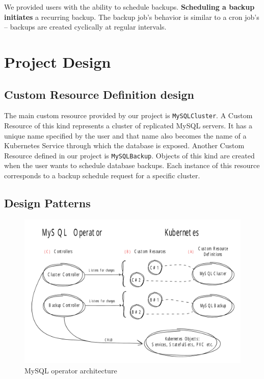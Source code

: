 We provided users with the ability to schedule backups. \textbf{Scheduling a backup initiates} a
recurring backup. The backup job’s behavior is similar to a cron job’s -- backups are created
cyclically at regular intervals.

\section{Project Design}

\subsection{Custom Resource Definition design}
The main custom resource provided by our project is \texttt{MySQLCluster}. A Custom Resource of this kind
represents a cluster of replicated MySQL servers. It has a unique name specified by the user and
that name also becomes the name of a Kubernetes Service through which the database is exposed.
Another Custom Resource defined in our project is \texttt{MySQLBackup}. Objects of this kind are created when
the user wants to schedule database backups. Each instance of this resource corresponds to a backup
schedule request for a specific cluster.

\subsection{Design Patterns}
\begin{figure}[!ht]
    \centering
    \includegraphics[width=1\textwidth, angle=0]{img/Design.pdf}
    \caption{MySQL operator architecture}
    \label{fig:design}
\end{figure}

